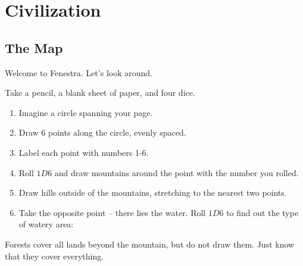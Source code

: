 \chapter{Civilization}

\section{The Map}

\begin{multicols}{2}

Welcome to Fenestra. Let's look around.


Take a pencil, a blank sheet of paper, and four dice.

\begin{enumerate}
\item
  Imagine a circle spanning your page.
\item
  Draw 6 points along the circle, evenly spaced.
\item
  Label each point with numbers 1-6.
\item
  Roll $1D6$ and draw mountains around the point with the number you rolled.
\item
  Draw hills outside of the mountains, stretching to the nearest two points.
\item
  Take the opposite point -- there lies the water.
  Roll $1D6$ to find out the type of watery area:

\end{enumerate}

\noindent
Forests cover all lands beyond the mountain, but do not draw them. Just
know that they cover everything.


\end{multicols}
